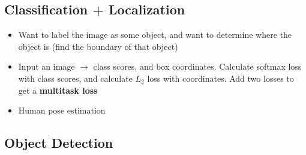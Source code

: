 \subsection{Classification + Localization}
\begin{itemize}
	\item Want to label the image as some object, and want to determine where the object is (find the boundary of that object)
	\item Input an image $\rightarrow$ class scores, and box coordinates. Calculate softmax loss with class scores, and calculate $L_2$ loss with coordinates. Add two losses to get a \textbf{multitask loss}
	\item Human pose estimation
\end{itemize}

\subsection{Object Detection}
